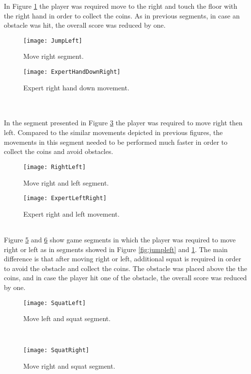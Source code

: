 In Figure \ref{fig:jumpright} the player was required move to the right and touch the floor with the right hand in order to collect the coins. As in previous segments, in case an obstacle was hit, the overall score was reduced by one.\\
\begin{figure}[h]
    \centering
    \texttt{[image: JumpLeft]}
    \caption{Move right segment.}
    \label{fig:jumpright}
\end{figure}
\begin{figure}[h]
    \centering
    \texttt{[image: ExpertHandDownRight]}
    \caption{Expert right hand down movement.}
    \label{fig:expertLeftDown}
\end{figure}\\\\
In the segment presented in Figure \ref{fig:rightleft} the player was required to move right then left. Compared to the similar movements depicted in previous figures, the movements in this segment needed to be performed much faster in order to collect the coins and avoid obstacles.\\
\begin{figure}[h]
    \centering
    \texttt{[image: RightLeft]}
    \caption{Move right and left segment.}
    \label{fig:rightleft}
\end{figure}
\begin{figure}[h]
    \centering
    \texttt{[image: ExpertLeftRight]}
    \caption{Expert right and left movement.}
    \label{fig:expertLeftRight}
\end{figure}\\
Figure \ref{fig:squatleft} and \ref{fig:squatright} show game segments in which the player was required to move right or left as in segments showed in Figure \ref{fig:jumpleft} and \ref{fig:jumpright}. The main difference is that after moving right or left, additional squat is required in order to avoid the obstacle and collect the coins. The obstacle was placed above the the coins, and in case the player hit one of the obstacle, the overall score was reduced by one.\\
\begin{figure}[h]
    \centering
    \texttt{[image: SquatLeft]}
    \caption{Move left and squat segment.}
    \label{fig:squatleft}
\end{figure}\\
\begin{figure}[h]
    \centering
    \texttt{[image: SquatRight]}
    \caption{Move right and squat segment.}
    \label{fig:squatright}
\end{figure}\\
